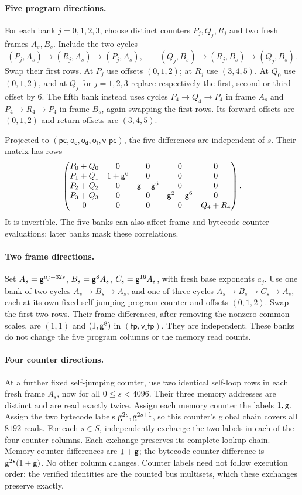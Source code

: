 \documentclass[11pt]{article}
\begin{document}
\paragraph{Five program directions.} For each bank $j=0,1,2,3$, choose distinct counters $P_j,Q_j,R_j$ and two fresh frames $A_s,B_s$. Include the two cycles
\[
 (P_j,A_s)\to(R_j,A_s)\to(P_j,A_s),\qquad
 (Q_j,B_s)\to(R_j,B_s)\to(Q_j,B_s).
\]
Swap their first rows. At $P_j$ use offsets $(0,1,2)$; at $R_j$ use $(3,4,5)$. At $Q_0$ use $(0,1,2)$, and at $Q_j$ for $j=1,2,3$ replace respectively the first, second or third offset by $6$. The fifth bank instead uses cycles $P_4\to Q_4\to P_4$ in frame $A_s$ and $P_4\to R_4\to P_4$ in frame $B_s$, again swapping the first rows. Its forward offsets are $(0,1,2)$ and return offsets are $(3,4,5)$.

Projected to $(\mathsf{pc},\mathsf{o_c},\mathsf{o_d},\mathsf{o_f},\mathsf{v\_pc})$, the five differences are independent of $s$. Their matrix has rows
\[
 \begin{pmatrix}
 P_0+Q_0&0&0&0&0\\
 P_1+Q_1&1+\mathsf{g}^6&0&0&0\\
 P_2+Q_2&0&\mathsf{g}+\mathsf{g}^6&0&0\\
 P_3+Q_3&0&0&\mathsf{g}^2+\mathsf{g}^6&0\\
 0&0&0&0&Q_4+R_4
 \end{pmatrix}.
\]
It is invertible. The five banks can also affect frame and bytecode-counter evaluations; later banks mask these correlations.

\paragraph{Two frame directions.} Set $A_s=\mathsf{g}^{a_j+32s}$, $B_s=\mathsf{g}^8 A_s$, $C_s=\mathsf{g}^{16}A_s$, with fresh base exponents $a_j$. Use one bank of two-cycles $A_s\to B_s\to A_s$, and one of three-cycles $A_s\to B_s\to C_s\to A_s$, each at its own fixed self-jumping program counter and offsets $(0,1,2)$. Swap the first two rows. Their frame differences, after removing the nonzero common scales, are $(1,1)$ and $(1,\mathsf{g}^8)$ in $(\mathsf{fp},\mathsf{v\_fp})$. They are independent. These banks do not change the five program columns or the memory read counts.

\paragraph{Four counter directions.} At a further fixed self-jumping counter, use two identical self-loop rows in each fresh frame $A_s$, now for all $0\le s<4096$. Their three memory addresses are distinct and are read exactly twice. Assign each memory counter the labels $1,\mathsf{g}$. Assign the two bytecode labels $\mathsf{g}^{2s},\mathsf{g}^{2s+1}$, so this counter's global chain covers all $8192$ reads. For each $s\in S$, independently exchange the two labels in each of the four counter columns. Each exchange preserves its complete lookup chain. Memory-counter differences are $1+\mathsf{g}$; the bytecode-counter difference is $\mathsf{g}^{2s}(1+\mathsf{g})$. No other column changes. Counter labels need not follow execution order: the verified identities are the counted bus multisets, which these exchanges preserve exactly.
\end{document}

